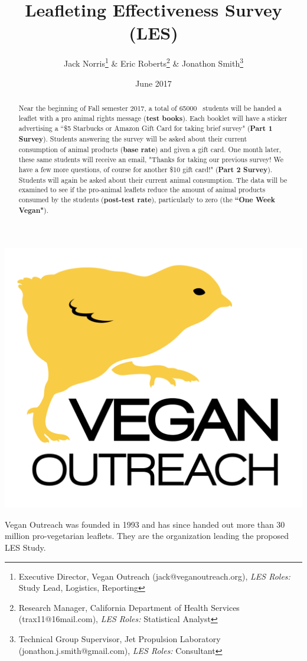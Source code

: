 \documentclass{tufte-handout}
\title{Leafleting Effectiveness Survey (LES)}
\author[Jack Norris \& Eric Roberts \& Jonathon Smith]{Jack Norris\thanks{Executive Director, Vegan Outreach (jack@veganoutreach.org), \textit{LES Roles:} Study Lead, Logistics, Reporting } \& Eric Roberts\thanks{Research Manager, California Department of Health Services (trax11@16mail.com), \textit{LES Roles:} Statistical Analyst} \& Jonathon Smith\thanks{Technical Group Supervisor, Jet Propulsion Laboratory (jonathon.j.smith@gmail.com), \textit{LES Roles:} Consultant}}
\date{June 2017} %
\newcommand{\totalbooklets}[0]{\textsc{65000}}
\begin{document}
\maketitle%


\begin{abstract}
\noindent

Near the beginning of Fall semester 2017, a total of \totalbooklets~ 
students will be handed a leaflet with a pro animal rights message 
(\textbf{test books}). Each booklet will have a
sticker advertising a ``\$5 Starbucks or Amazon Gift Card for taking
brief survey" (\textbf{Part 1 Survey}). Students answering the survey will be 
asked about their current consumption of animal products (\textbf{base rate}) 
and given a gift card. One month later, these same students will receive an 
email, "Thanks for taking our previous survey! We have a few more questions, 
of course for another \$10 gift card!" (\textbf{Part 2 Survey}). Students 
will again be asked about their current animal consumption. The data will
be examined to see if the pro-animal leaflets reduce the amount of
animal products consumed by the students (\textbf{post-test rate}), 
particularly to zero (the \textbf{``One Week Vegan"}). 

\end{abstract}

\begin{marginfigure}[0 in]%
  \raggedleft
  \includegraphics[width=\textwidth]{vologo.png}
  \caption{Vegan Outreach was founded in 1993 and has since handed out more
  than 30 million pro-vegetarian leaflets. They are the organization leading 
  the proposed LES Study.}
  \label{fig:vologo}
\end{marginfigure}
  
\end{document}
